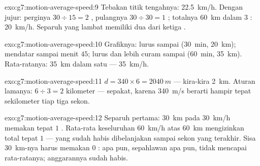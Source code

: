 \begin{solution}{exo:g7:motion-average-speed:9}
Tebakan titik tengahnya: \qty{22.5}{km/h}. Dengan jujur: perginya $30 \div 15 = 2$
, pulangnya $30 \div 30 = 1$ ; totalnya \qty{60}{km} dalam $3$
: \qty{20}{km/h}. Separuh yang lambat memiliki dua dari ketiga
.
\end{solution}

\begin{solution}{exo:g7:motion-average-speed:10}
Grafiknya: lurus sampai (\qty{30}{min}, \qty{20}{km}); mendatar sampai
menit $45$; lurus dan lebih curam sampai (\qty{60}{min}, \qty{35}{km}).
Rata-ratanya: \qty{35}{km} dalam satu  --- \qty{35}{km/h}.
\end{solution}

\begin{solution}{exo:g7:motion-average-speed:11}
$d = 340 \times 6 = \qty{2040}{m}$ --- kira-kira \qty{2}{km}. Aturan
lamanya: $6 \div 3 = 2$ kilometer --- sepakat, karena
\qty{340}{m/s} berarti hampir tepat sekilometer tiap tiga
sekon.
\end{solution}

\begin{solution}{exo:g7:motion-average-speed:12}
Separuh pertama: \qty{30}{km} pada \qty{30}{km/h} memakan tepat $1$
. Rata-rata keseluruhan \qty{60}{km/h} atas \qty{60}{km} mengizinkan
total tepat $1$  --- yang sudah habis dibelanjakan sampai sekon
yang terakhir. Sisa \qty{30}{km}-nya harus memakan $0$ : 
apa pun, sepahlawan apa pun, tidak mencapai rata-ratanya; anggarannya
sudah habis.
\end{solution}

